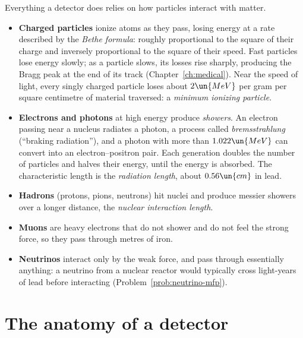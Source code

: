 Everything a detector does relies on how particles interact with matter.
\begin{itemize}[itemsep=4pt]
  \item \textbf{Charged particles} ionize atoms as they pass, losing energy at a rate described by the \emph{Bethe formula}: roughly proportional to the square of their charge and inversely proportional to the square of their speed. Fast particles lose energy slowly; as a particle slows, its losses rise sharply, producing the Bragg peak at the end of its track (Chapter~\ref{ch:medical}). Near the speed of light, every singly charged particle loses about $2\un{MeV}$ per gram per square centimetre of material traversed: a \emph{minimum ionizing particle}.
  \item \textbf{Electrons and photons} at high energy produce \emph{showers}. An electron passing near a nucleus radiates a photon, a process called \emph{bremsstrahlung} (``braking radiation''), and a photon with more than $1.022\un{MeV}$ can convert into an electron--positron pair. Each generation doubles the number of particles and halves their energy, until the energy is absorbed. The characteristic length is the \emph{radiation length}, about $0.56\un{cm}$ in lead.
  \item \textbf{Hadrons} (protons, pions, neutrons) hit nuclei and produce messier showers over a longer distance, the \emph{nuclear interaction length}.
  \item \textbf{Muons} are heavy electrons that do not shower and do not feel the strong force, so they pass through metres of iron.
  \item \textbf{Neutrinos} interact only by the weak force, and pass through essentially anything: a neutrino from a nuclear reactor would typically cross light-years of lead before interacting (Problem~\ref{prob:neutrino-mfp}).
\end{itemize}

\section{The anatomy of a detector}

